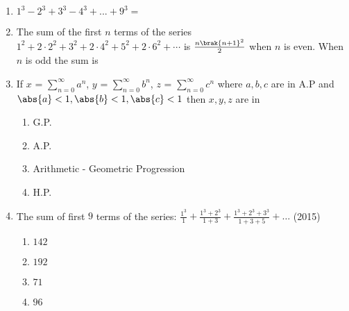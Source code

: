 \begin{enumerate}[label=\thesubsection.\arabic*,ref=\thesubsection.\theenumi]
\item {$1^{3}-2^{3}+3^{3}-4^{3}+...
+9^{3}=$}
{\hfill{}} 
\begin{enumerate}
\end{enumerate}
\item {The sum of the first $n$ terms of the series $1^2+2\cdot2^2+3^2+2\cdot4^2+5^2+2\cdot6^2+\cdots$ is $\frac{n\brak{n+1}^2}{2}$ when $n$ is even. When $n$ is odd the sum is}
{\hfill{}}
\begin{enumerate}
\end{enumerate}
\item {If $x$ = $\sum\limits_{n=0}^{\infty}a^n$, $y$ = $\sum\limits_{n=0}^{\infty}b^n$, $z$ = $\sum\limits_{n=0}^{\infty}c^n$ where $a,b,c$ are in A.P and $\abs{a}<1,\abs{b}<1,\abs{c}<1$ then $x,y,z$ are in}
{\hfill{}} 
\begin{enumerate}
\item  {G.P.}
\item  {A.P.}
\item  {Arithmetic - Geometric Progression}
\item  {H.P.}
\end{enumerate}
    \item The sum of first $9$ terms of the series:
	    $\frac{1^3}{1}+\frac{1^3+2^3}{1+3}+\frac{1^3+2^3+3^3}{1+3+5}+\dots$
    \hfill(2015)
    \begin{multicols}{4}
\begin{enumerate}    
    \item $142$
    \item $192$
    \item $71$
    \item $96$
    \end{enumerate}
\end{multicols}

\end{enumerate}
